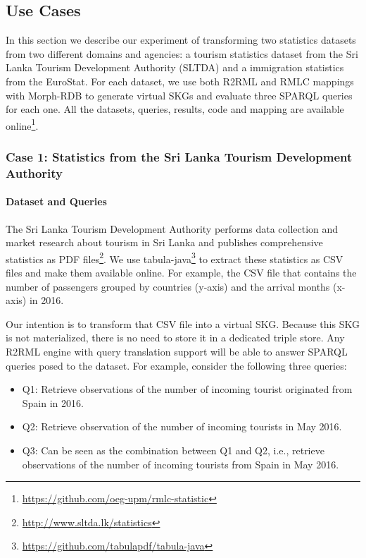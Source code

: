 \subsection{Use Cases}
In this section we describe our experiment of transforming two statistics datasets from two different domains and agencies: a tourism statistics dataset from the Sri Lanka Tourism Development Authority (SLTDA) and a immigration statistics from the EuroStat. For each dataset, we use both R2RML and RMLC mappings with Morph-RDB to generate virtual SKGs and evaluate three SPARQL queries for each one. All the datasets, queries, results, code and mapping are available online\footnote{\url{https://github.com/oeg-upm/rmlc-statistic}}.

\subsubsection{Case 1: Statistics from the Sri Lanka Tourism Development Authority}
\noindent\paragraph{Dataset and Queries}
The Sri Lanka Tourism Development Authority performs data collection and market research about tourism in Sri Lanka and publishes comprehensive statistics as PDF files\footnote{\url{http://www.sltda.lk/statistics}}. We use tabula-java\footnote{\url{https://github.com/tabulapdf/tabula-java}} to extract these statistics as CSV files and make them available online. For example, the CSV file that contains the number of passengers grouped by countries (y-axis) and the arrival months (x-axis) in 2016.

Our intention is to transform that CSV file into a virtual SKG. Because this SKG is not materialized, there is no need to store it in a dedicated triple store. Any R2RML engine with query translation support will be able to answer SPARQL queries posed to the dataset. For example, consider the following three queries:
\begin{itemize}
\item Q1: Retrieve observations of the number of incoming tourist originated from Spain in 2016.
\item Q2: Retrieve observation of the number of incoming tourists in May 2016.
\item Q3: Can be seen as the combination between Q1 and Q2, i.e., retrieve observations of the number of incoming tourists from Spain in May 2016. 
\end{itemize}

